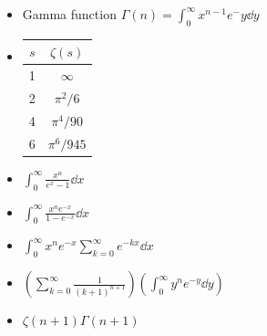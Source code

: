 \documentclass{article}
\theoremstyle{remark}
\begin{document}
\begin{enumerate}
\begin{itemize}
            \item Gamma function $\Gamma(n)=\int_0^\infty x^{n-1}e^-y\dd y$
            \item \begin{tabular}{|c|c|}
                    \hline
                    $s$ & $\zeta(s)$\\
                    \hline
                    1 & $\infty$\\
                    2 & $\pi^2/6$\\
                    4 & $\pi^4/90$\\
                    6 & $\pi^6/945$\\\hline
                \end{tabular}
            \item $\int_0^\infty\frac{x^n}{e^x-1}\dd x$
            \item $\int_0^\infty\frac{x^ne^{-x}}{1-e^{-x}}\dd x$
            \item $\int_0^\infty x^ne^{-x}\sum_{k=0}^\infty e^{-kx}\dd x$
            \item $\left(\sum_{k=0}^\infty\frac{1}{(k+1)^{n+1}}\right)\left(\int_0^\infty y^ne^{-y}\dd y\right)$
            \item $\zeta(n+1)\Gamma(n+1)$
        \end{itemize}
\end{enumerate}
    
\end{document}

